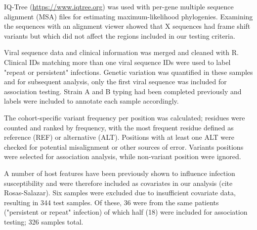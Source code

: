 \documentclass{article}
\begin{document}
IQ-Tree 
(\url{https://www.iqtree.org})
\cite{nguyen2015iq}
was used with per-gene multiple sequence alignment (MSA) files for estimating maximum-likelihood phylogenies.
Examining the sequences with an alignment viewer showed that X sequences 
had frame shift variants but which did not affect the regions included in our testing criteria.

Viral sequence data and clinical information was merged and cleaned with R.
Clinical IDs matching more than one viral sequence IDs were used to label "repeat or persistent" infections. 
Genetic variation was quantified in these samples and for subsequent analysis, only the first viral sequence was included for association testing. 
Strain A and B typing had been completed previously and labels were included to annotate each sample accordingly.

The cohort-specific variant frequency per position was calculated;
residues were counted and ranked by frequency,
with the most frequent residue defined as reference (REF) or alternative (ALT).
Positions with at least one ALT were checked for potential misalignment or other sources of error. 
Variants positions were selected for association analysis, while non-variant position were ignored.

A number of host features have been previously shown to influence infection susceptibility and were therefore included as covariates in our analysis (cite Rosas-Salazar).
Six samples were excluded due to insufficient covariate data, resulting in 344 test samples. 
Of these, 36 were from the same patients ("persistent or repeat" infection) of which half (18) were included for association testing; 326 samples total.
\end{document}
